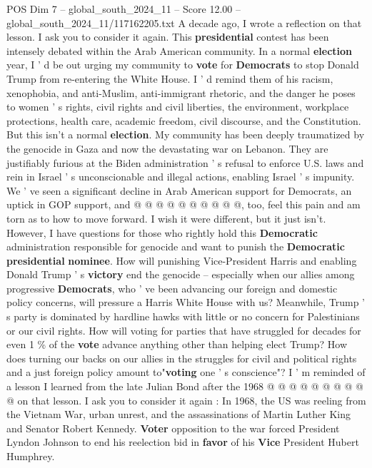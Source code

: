 \begin{textsample}{POS Dim 7 – global\_south\_2024\_11 – Score 12.00 – global\_south\_2024\_11/117162205.txt}  \label{ex:f7_pos_138}
A decade ago, I wrote a reflection on that lesson.
I ask you to consider it again.
This \textbf{presidential} contest has been intensely debated within the Arab American community.
In a normal \textbf{election} year, I ' d be out urging my community to \textbf{vote} for \textbf{Democrats} to stop Donald Trump from re-entering the White House.
I ' d remind them of his racism, xenophobia, and anti-Muslim, anti-immigrant rhetoric, and the danger he poses to women ' s rights, civil rights and civil liberties, the environment, workplace protections, health care, academic freedom, civil discourse, and the Constitution.
But this isn't a normal \textbf{election}.
My community has been deeply traumatized by the genocide in Gaza and now the devastating war on Lebanon.
They are justifiably furious at the Biden administration ' s refusal to enforce U.S. laws and rein in Israel ' s unconscionable and illegal actions, enabling Israel ' s impunity.
We ' ve seen a significant decline in Arab American support for Democrats, an uptick in GOP support, and @ @ @ @ @ @ @ @ @ @, too, feel this pain and am torn as to how to move forward.
I wish it were different, but it just isn't.
However, I have questions for those who rightly hold this \textbf{Democratic} administration responsible for genocide and want to punish the \textbf{Democratic} \textbf{presidential} \textbf{nominee}.
How will punishing Vice-President Harris and enabling Donald Trump ' s \textbf{victory} end the genocide -- especially when our allies among progressive \textbf{Democrats}, who ' ve been advancing our foreign and domestic policy concerns, will pressure a Harris White House with us?
Meanwhile, Trump ' s party is dominated by hardline hawks with little or no concern for Palestinians or our civil rights.
How will voting for parties that have struggled for decades for even 1 \% of the \textbf{vote} advance anything other than helping elect Trump?
How does turning our backs on our allies in the struggles for civil and political rights and a just foreign policy amount to"\textbf{voting} one ' s conscience"?
I ' m reminded of a lesson I learned from the late Julian Bond after the 1968 @ @ @ @ @ @ @ @ @ @ on that lesson.
I ask you to consider it again : In 1968, the US was reeling from the Vietnam War, urban unrest, and the assassinations of Martin Luther King and Senator Robert Kennedy. \textbf{Voter} opposition to the war forced President Lyndon Johnson to end his reelection bid in \textbf{favor} of his \textbf{Vice} President Hubert Humphrey.

\end{textsample}
